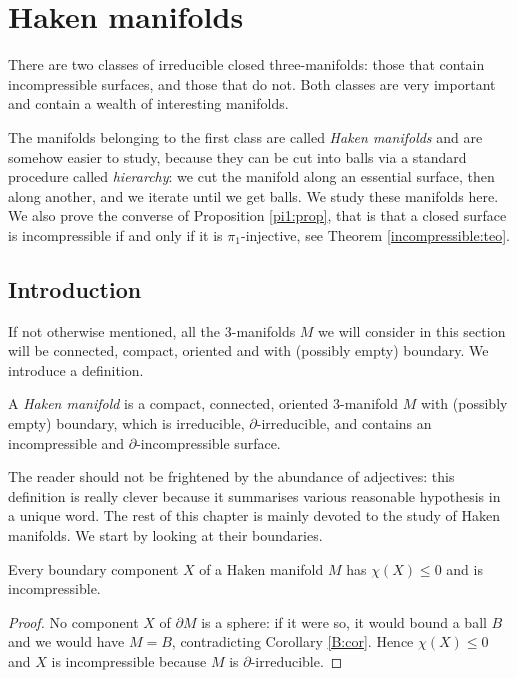 \section{Haken manifolds}
There are two classes of irreducible closed three-manifolds: those that contain incompressible surfaces, and those that do not. Both classes are very important and contain a wealth of interesting manifolds.

The manifolds belonging to the first class are called \emph{Haken manifolds} and are somehow easier to study, because they can be cut into balls via a standard procedure called \emph{hierarchy}: we cut the manifold along an essential surface, then along another, and we iterate until we get balls. We study these manifolds here. We also prove the converse of Proposition \ref{pi1:prop}, that is that a closed surface is incompressible if and only if it is $\pi_1$-injective, see Theorem \ref{incompressible:teo}.

\subsection{Introduction}
If not otherwise mentioned, all the 3-manifolds $M$ we will consider in this section will be connected, compact, oriented and with (possibly empty) boundary.
We introduce a definition.

\begin{defn} A \emph{Haken manifold} is a compact, connected, oriented 3-manifold $M$ with (possibly empty) boundary, which is irreducible, $\partial$-irreducible, and contains an incompressible and $\partial$-incompressible surface.
\end{defn} 

The reader should not be frightened by the abundance of adjectives: this definition is really clever because it summarises various reasonable hypothesis in a unique word. The rest of this chapter is mainly devoted to the study of Haken manifolds. We start by looking at their boundaries.

\begin{prop}
Every boundary component $X$ of a Haken manifold $M$ has $\chi(X)\leqslant 0$ and is incompressible.
\end{prop}
\begin{proof}
No component $X$ of $\partial M$ is a sphere: if it were so, it would bound a ball $B$ and we would have $M=B$, contradicting Corollary \ref{B:cor}. Hence $\chi(X)\leqslant 0$ and $X$ is incompressible
because $M$ is $\partial$-irreducible.
\end{proof}

